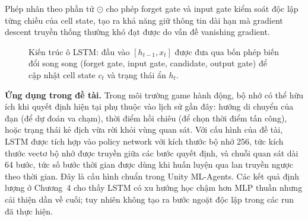Phép nhân theo phần tử $\odot$ cho phép forget gate và input gate kiểm soát độc lập từng chiều của cell state, tạo ra khả năng giữ thông tin dài hạn mà gradient descent truyền thống thường khó đạt được do vấn đề vanishing gradient.

\begin{figure}[H]
\centering
{}
\caption{Kiến trúc ô LSTM: đầu vào $[h_{t-1},x_t]$ được đưa qua bốn phép biến đổi song song (forget gate, input gate, candidate, output gate) để cập nhật cell state $c_t$ và trạng thái ẩn $h_t$.}
\label{fig:lstm_cell}
\end{figure}

\textbf{Ứng dụng trong đề tài.} Trong môi trường game hành động, bộ nhớ có thể hữu ích khi quyết định hiện tại phụ thuộc vào lịch sử gần đây: hướng di chuyển của đạn (để dự đoán va chạm), thời điểm hồi chiêu (để chọn thời điểm tấn công), hoặc trạng thái kẻ địch vừa rời khỏi vùng quan sát. Với cấu hình của đề tài, LSTM được tích hợp vào policy network với kích thước bộ nhớ 256, tức kích thước vectơ bộ nhớ được truyền giữa các bước quyết định, và chuỗi quan sát dài 64 bước, tức số bước thời gian được dùng khi huấn luyện qua lan truyền ngược theo thời gian. Đây là cấu hình chuẩn trong Unity ML-Agents. Các kết quả định lượng ở Chương~4 cho thấy LSTM có xu hướng học chậm hơn MLP thuần nhưng cải thiện dần về cuối; tuy nhiên không tạo ra bước ngoặt độc lập trong các run đã thực hiện.

